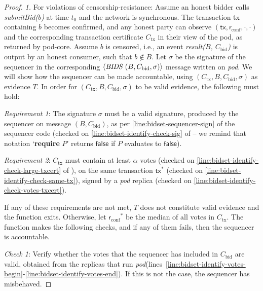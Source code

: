\documentclass[pdflatex,sn-mathphys-num]{sn-jnl}%
\theoremstyle{thmstyleone}%
\theoremstyle{thmstyletwo}%
\theoremstyle{thmstylethree}%
\newcommand{\podtm}{\textsf{pod}\xspace}
\newcommand{\bidcert}{\ensuremath{C_\text{bid}}\xspace}
\newcommand{\false}{\mathsf{false}}
\newcommand{\op}[1]{\textsl{#1}}
\newcommand{\operand}[1]{\textsf{#1}}
\newcommand{\tx}{\operand{tx}\xspace}
\newcommand{\round}{\operand{r}\xspace}
\newcommand{\rconf}{\ensuremath{\round_\text{conf}}\xspace}
\newcommand{\identifySequencer}[1]{\ensuremath{\mathsf{identifySequencer}(#1)}\xspace}
\newcommand{\txcert}{\ensuremath{C_\text{tx}}\xspace}
\newcommand{\ppcert}{\ensuremath{C_\text{pp}}\xspace}
\newcommand{\tran}{\ensuremath{T}\xspace}
\newcommand{\msg}[2]{\ensuremath{\langle\textit{\uppercase{#1 }}#2\rangle}\xspace}
\newcommand{\msgbidresult}[1]{\msg{bids}{ #1}}
\let\oldalpha\alpha
\renewcommand{\alpha}{\ensuremath{\oldalpha}\xspace}
\newcommand{\tzero}{\ensuremath{t_0}\xspace}
\newcommand{\bag}{\ensuremath{B}\xspace}
\newcommand{\sig}{\ensuremath{\sigma}\xspace}
\newcommand{\opResult}[1]{\op{result(#1)}\xspace}
\newcommand{\opSubmitBid}[1]{\op{submitBid(#1)}\xspace}
\newcommand{\bid}{\ensuremath{b}\xspace}
\newcommand{\podInst}{\textit{pod}\xspace}
\begin{document}
\begin{appendices}
\begin{proof}
    \noindent\emph{1.} For violations of censorship-resistance:
    Assume an honest bidder calls \opSubmitBid{\bid} at time \tzero and the network is synchronous.
    The transaction \tx containing \bid becomes confirmed, and any honest party can observe $(\tx, \rconf, \cdot, \cdot)$ and the corresponding transaction certificate \txcert in their view of the \podtm, as returned by \podtm-core.
    Assume \bid is censored, i.e., an event \opResult{\bag, \bidcert} is output by an honest consumer, such that $\bid \not \in \bag$.
    Let \sig be the signature of the sequencer in the corresponding \msgbidresult{(\bag, \bidcert, \sigma)} message written on \podInst.
    We will show how the sequencer can be made accountable, using $(\txcert, \bag, \bidcert, \sigma)$ as evidence \tran.
    In order for $(\txcert, \bag, \bidcert, \sigma)$ to be valid evidence, the following must hold:

    \emph{Requirement 1}: The signature \sig must be a valid signature, produced by the sequencer on message $(\bag, \bidcert)$, as per \cref{line:bidset-sequencer-sign} of the sequencer code (checked on \cref{line:bidset-identify-check-sig} of  -- we remind that notation `\textbf{require} $P$' returns $\false$ if $P$ evaluates to $\false$).


    \emph{Requirement 2}: \txcert must contain at least \alpha votes (checked on \cref{line:bidset-identify-check-large-txcert} of ), on the same transaction $\tx^*$ (checked on \cref{line:bidset-identify-check-same-tx}), signed by a \podInst replica (checked on \cref{line:bidset-identify-check-votes-txcert}).

    If any of these requirements are not met, \tran does not constitute valid evidence and the function exits. Otherwise, let $\rconf^*$ be the median of all votes in \txcert. The function makes the following checks, and if any of them fails, then the sequencer is accountable.

    \emph{Check 1}: Verify whether the votes that the sequencer has included in \bidcert are valid, obtained from the replicas that run \podInst (lines~\ref{line:bidset-identify-votes-begin}-\ref{line:bidset-identify-votes-end}). If this is not the case, the sequencer has misbehaved.


\end{proof}
\end{appendices}
\end{document}
